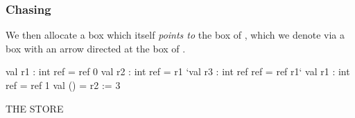 \documentclass[aspectratio=169]{beamer}
\newcommand{\topthing}[2]{
      \begin{minipage}[t][#1][t]{\textwidth}
        \vspace{\fill}
        #2
        \vspace{\fill}
      \end{minipage}
    }
\begin{document}
\begin{frame}[fragile]
  \frametitle{ Chasing}

  \topthing{0.2in}{
    We then allocate a box which itself \textit{points to} the box of \code{r1},
    which we denote via a box with an arrow directed at the box of \code{r1}.
  }

  \vspace{10pt}

  \begin{center}
    \begin{minipage}[t][2.1in][t]{0.6\textwidth}
      \vspace{\fill}
      \begin{codeblock}
        val r1 : int ref     = ref 0
        val r2 : int ref     = r1
        `val r3 : int ref ref = ref r1`
        val r1 : int ref     = ref 1
        val ()               = r2 := 3
      \end{codeblock}
      \vspace{\fill}
    \end{minipage}
    \hfill\vline\hfill
    \begin{minipage}[t][2.1in][t]{0.3\textwidth}
      \centering
      {\hspace{-20pt}\color{gray} \large THE STORE}

      \vspace{\fill}
      \vspace{\fill}
    \end{minipage}
  \end{center}
\end{frame}
\end{document}
